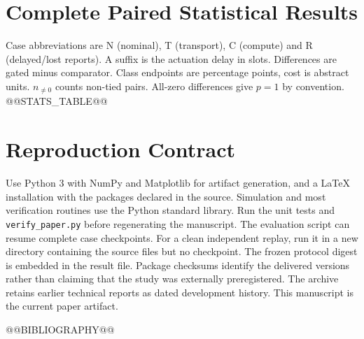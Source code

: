 \documentclass[10pt,a4paper]{article}
\begin{document}
\appendix
\section{Complete Paired Statistical Results}\label{app:stats}
Case abbreviations are N (nominal), T (transport), C (compute) and R (delayed/lost
reports). A suffix is the actuation delay in slots. Differences are gated minus
comparator. Class endpoints are percentage points, cost is abstract units.
$n_{\ne0}$ counts non-tied pairs. All-zero differences give $p=1$ by convention.
@@STATS_TABLE@@

\section{Reproduction Contract}
Use Python 3 with NumPy and Matplotlib for artifact generation, and a LaTeX
installation with the packages declared in the source. Simulation and most
verification routines use the Python standard library. Run the unit tests and
\texttt{verify\_paper.py} before regenerating the manuscript. The evaluation
script can resume complete case checkpoints. For a clean independent replay,
run it in a new directory containing the source files but no checkpoint.
The frozen protocol digest is embedded in the result file. Package checksums
identify the delivered versions rather than claiming that the study was
externally preregistered. The archive retains earlier technical reports as
dated development history. This manuscript is the current paper artifact.

@@BIBLIOGRAPHY@@
\end{document}

